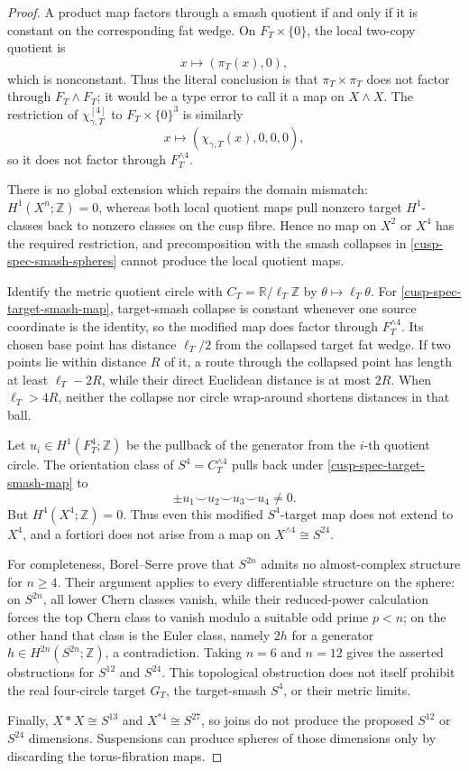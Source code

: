 \begin{proof}
A product map factors through a smash quotient if and only if it is
constant on the corresponding fat wedge.  On
\(F_T\times\{0\}\), the local two-copy quotient is
\[
 x\longmapsto(\pi_T(x),0),
\]
which is nonconstant.  Thus the literal conclusion is that
\(\pi_T\times\pi_T\) does not factor through \(F_T\wedge F_T\); it would
be a type error to call it a map on \(X\wedge X\).  The restriction of
\(\chi_{\gamma,T}^{[4]}\) to \(F_T\times\{0\}^3\) is similarly
\[
 x\longmapsto(\chi_{\gamma,T}(x),0,0,0),
\]
so it does not factor through \(F_T^{\wedge4}\).

There is no global extension which repairs the domain mismatch:
\(H^1(X^n;\mathbb Z)=0\), whereas both local quotient maps pull nonzero
target \(H^1\)-classes back to nonzero classes on the cusp fibre.  Hence no
map on \(X^2\) or \(X^4\) has the required restriction, and precomposition
with the smash collapses in \cref{cusp-spec-smash-spheres} cannot produce
the local quotient maps.

Identify the metric quotient circle with
\(C_T=\mathbb R/\ell_T\mathbb Z\) by
\(\theta\mapsto\ell_T\theta\).  For
\cref{cusp-spec-target-smash-map}, target-smash collapse is constant
whenever one source coordinate is the identity, so the modified map does
factor through \(F_T^{\wedge4}\).  Its chosen base point has distance
\(\ell_T/2\) from the collapsed target fat wedge.  If two points lie
within distance \(R\) of it, a route through the collapsed point has
length at least \(\ell_T-2R\), while their direct Euclidean distance is at
most \(2R\).  When \(\ell_T>4R\), neither the collapse nor circle
wrap-around shortens distances in that ball.

Let \(u_i\in H^1(F_T^4;\mathbb Z)\) be the pullback of the generator from
the \(i\)-th quotient circle.  The orientation class of
\(S^4=C_T^{\wedge4}\) pulls back under
\cref{cusp-spec-target-smash-map} to
\[
 \pm u_1\smile u_2\smile u_3\smile u_4\ne0.
\]
But \(H^4(X^4;\mathbb Z)=0\).  Thus even this modified \(S^4\)-target map
does not extend to \(X^4\), and a fortiori does not arise from a map on
\(X^{\wedge4}\cong S^{24}\).

For completeness, Borel--Serre prove that \(S^{2n}\) admits no
almost-complex structure for \(n\ge4\).  Their argument applies to every
differentiable structure on the sphere: on \(S^{2n}\), all lower Chern
classes vanish, while their reduced-power calculation forces the top
Chern class to vanish modulo a suitable odd prime \(p<n\); on the other
hand that class is the Euler class, namely \(2h\) for a generator
\(h\in H^{2n}(S^{2n};\mathbb Z)\), a contradiction.  Taking \(n=6\) and
\(n=12\) gives the asserted obstructions for \(S^{12}\) and \(S^{24}\).
This topological obstruction does not itself prohibit the real
four-circle target \(G_T\), the target-smash \(S^4\), or their metric
limits.

Finally,
\(X*X\cong S^{13}\) and \(X^{*4}\cong S^{27}\), so joins do not produce
the proposed \(S^{12}\) or \(S^{24}\) dimensions.  Suspensions can produce
spheres of those dimensions only by discarding the torus-fibration maps.
\end{proof}
